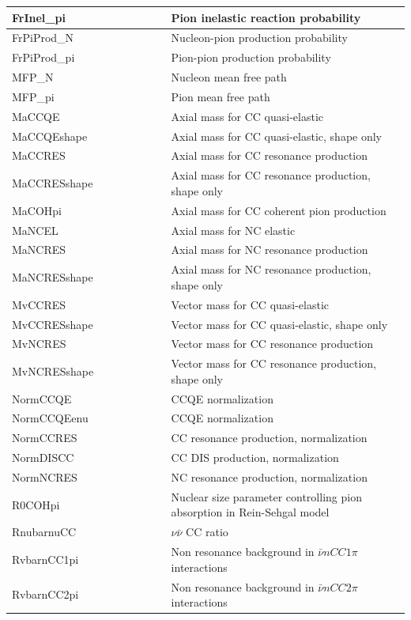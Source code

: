 {\begin{longtable}{|p{0.4\linewidth}|p{0.6\linewidth}|}
 FrInel\_pi &Pion inelastic reaction probability \\ \hline
 FrPiProd\_N &Nucleon-pion production probability  \\ \hline
 FrPiProd\_pi &Pion-pion production probability \\ \hline
 MFP\_N & Nucleon mean free path \\ \hline
 MFP\_pi & Pion mean free path \\ \hline
 MaCCQE & Axial mass for CC quasi-elastic \\ \hline
 MaCCQEshape & Axial mass for CC quasi-elastic, shape only \\ \hline
 MaCCRES & Axial mass for CC resonance production \\ \hline
 MaCCRESshape & Axial mass for CC resonance production, shape only \\ \hline
 MaCOHpi & Axial mass for CC coherent pion production \\ \hline
 MaNCEL & Axial mass for NC elastic \\ \hline
 MaNCRES & Axial mass for NC resonance production \\ \hline
 MaNCRESshape & Axial mass for NC resonance production, shape only \\ \hline
 MvCCRES & Vector mass for CC quasi-elastic \\ \hline
 MvCCRESshape & Vector mass for CC quasi-elastic, shape only \\ \hline
 MvNCRES & Vector mass for CC resonance production \\ \hline
 MvNCRESshape & Vector mass for CC resonance production, shape only \\ \hline
 NormCCQE & CCQE normalization \\ \hline
 NormCCQEenu & CCQE normalization \\ \hline
 NormCCRES & CC resonance production, normalization \\ \hline
 NormDISCC & CC DIS production, normalization  \\ \hline
 NormNCRES & NC resonance production, normalization  \\ \hline
 R0COHpi & Nuclear size parameter controlling pion absorption  in Rein-Sehgal model  \\ \hline
 RnubarnuCC & $\nu\bar{\nu} $ CC ratio\\ \hline
 RvbarnCC1pi & Non resonance background in $ \bar{\nu} n CC 1\pi$ interactions \\ \hline
 RvbarnCC2pi & Non resonance background in $ \bar{\nu} n CC 2\pi$ interactions \\ \hline

\end{longtable}}
